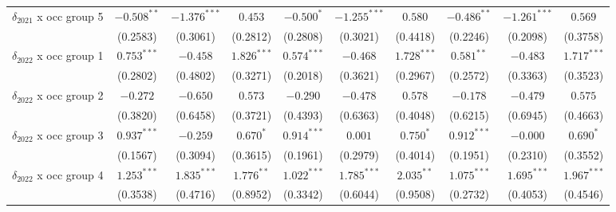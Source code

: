 \begin{tabular}{l|ccc|ccc|ccc|}
$\delta_{2021}$ x occ group 5          &           $-0.508^{**}$ &  $-1.376^{***}$ &         $0.453$ &               $-0.500^*$ &  $-1.255^{***}$ &         $0.580$ &            $-0.486^{**}$ &  $-1.261^{***}$ &         $0.569$ \\
                                       &                (0.2583) &        (0.3061) &        (0.2812) &                 (0.2808) &        (0.3021) &        (0.4418) &                 (0.2246) &        (0.2098) &        (0.3758) \\
$\delta_{2022}$ x occ group 1          &           $0.753^{***}$ &        $-0.458$ &   $1.826^{***}$ &            $0.574^{***}$ &        $-0.468$ &   $1.728^{***}$ &             $0.581^{**}$ &        $-0.483$ &   $1.717^{***}$ \\
                                       &                (0.2802) &        (0.4802) &        (0.3271) &                 (0.2018) &        (0.3621) &        (0.2967) &                 (0.2572) &        (0.3363) &        (0.3523) \\
$\delta_{2022}$ x occ group 2          &                $-0.272$ &        $-0.650$ &         $0.573$ &                 $-0.290$ &        $-0.478$ &         $0.578$ &                 $-0.178$ &        $-0.479$ &         $0.575$ \\
                                       &                (0.3820) &        (0.6458) &        (0.3721) &                 (0.4393) &        (0.6363) &        (0.4048) &                 (0.6215) &        (0.6945) &        (0.4663) \\
$\delta_{2022}$ x occ group 3          &           $0.937^{***}$ &        $-0.259$ &       $0.670^*$ &            $0.914^{***}$ &         $0.001$ &       $0.750^*$ &            $0.912^{***}$ &        $-0.000$ &       $0.690^*$ \\
                                       &                (0.1567) &        (0.3094) &        (0.3615) &                 (0.1961) &        (0.2979) &        (0.4014) &                 (0.1951) &        (0.2310) &        (0.3552) \\
$\delta_{2022}$ x occ group 4          &           $1.253^{***}$ &   $1.835^{***}$ &    $1.776^{**}$ &            $1.022^{***}$ &   $1.785^{***}$ &    $2.035^{**}$ &            $1.075^{***}$ &   $1.695^{***}$ &   $1.967^{***}$ \\
                                       &                (0.3538) &        (0.4716) &        (0.8952) &                 (0.3342) &        (0.6044) &        (0.9508) &                 (0.2732) &        (0.4053) &        (0.4546) \\

\end{tabular}
